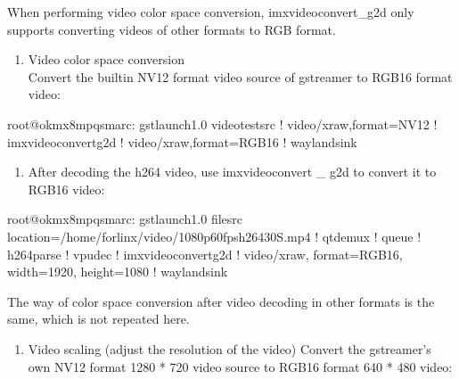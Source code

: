 \documentclass[letterpaper,10pt,openany,english]{sphinxmanual}
\begin{document}
\sphinxAtStartPar
When performing video color space conversion, imxvideoconvert\_g2d only supports converting videos of other formats to RGB format.
\begin{enumerate}
%
\item {} 
\sphinxAtStartPar
Video color space conversion\\
Convert the built\sphinxhyphen{}in NV12 format video source of gstreamer to RGB16 format video:

\end{enumerate}

\begin{sphinxVerbatim}[commandchars=\\\{\}]
root@ok\PYGZhy{}mx8mpq\PYGZhy{}smarc:\PYGZti{}\PYGZsh{} gst\PYGZhy{}launch\PYGZhy{}1.0 videotestsrc ! video/x\PYGZhy{}raw,format=NV12 ! imxvideoconvert\PYGZus{}g2d ! video/x\PYGZhy{}raw,format=RGB16 ! waylandsink
\end{sphinxVerbatim}
\begin{enumerate}
%
\setcounter{enumi}{1}
\item {} 
\sphinxAtStartPar
After decoding the h264 video, use imxvideoconvert \_ g2d to convert it to RGB16 video:

\end{enumerate}

\begin{sphinxVerbatim}[commandchars=\\\{\}]
root@ok\PYGZhy{}mx8mpq\PYGZhy{}smarc:\PYGZti{}\PYGZsh{} gst\PYGZhy{}launch\PYGZhy{}1.0 filesrc location=/home/forlinx/video/1080p\PYGZus{}60fps\PYGZus{}h264\PYGZhy{}30S.mp4 ! qtdemux ! queue ! h264parse ! vpudec ! imxvideoconvert\PYGZus{}g2d ! video/x\PYGZhy{}raw, format=RGB16, width=1920, height=1080 ! waylandsink
\end{sphinxVerbatim}

\sphinxAtStartPar
The way of color space conversion after video decoding in other formats is the same, which is not repeated here.
\begin{enumerate}
%
\setcounter{enumi}{2}
\item {} 
\sphinxAtStartPar
Video scaling (adjust the resolution of the video) Convert the gstreamer’s own NV12 format 1280 * 720 video source to RGB16 format 640 * 480 video:

\end{enumerate}
\end{document}
